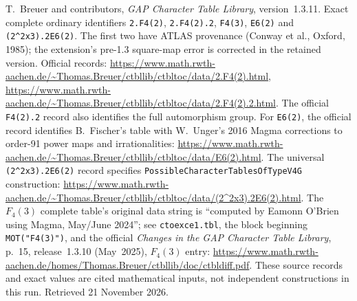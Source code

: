 T.~Breuer and contributors, \emph{GAP Character Table Library},
version~1.3.11. Exact complete ordinary identifiers
\texttt{2.F4(2)}, \texttt{2.F4(2).2}, \texttt{F4(3)},
\texttt{E6(2)} and \texttt{(2\^{}2x3).2E6(2)}.
The first two have ATLAS provenance (Conway et al., Oxford, 1985);
the extension's pre-1.3 square-map error is corrected in the retained
version. Official records:
\url{https://www.math.rwth-aachen.de/~Thomas.Breuer/ctbllib/ctbltoc/data/2.F4(2).html},
\url{https://www.math.rwth-aachen.de/~Thomas.Breuer/ctbllib/ctbltoc/data/2.F4(2).2.html}.
The official \texttt{F4(2).2} record also identifies the full automorphism group.
For \texttt{E6(2)}, the official record identifies B.~Fischer's table
with W.~Unger's 2016 Magma corrections to order-91 power maps and
irrationalities:
\url{https://www.math.rwth-aachen.de/~Thomas.Breuer/ctbllib/ctbltoc/data/E6(2).html}.
The universal \texttt{(2\^{}2x3).2E6(2)} record specifies
\texttt{PossibleCharacterTablesOfTypeV4G} construction:
\url{https://www.math.rwth-aachen.de/~Thomas.Breuer/ctbllib/ctbltoc/data/(2^2x3).2E6(2).html}.
The $F_4(3)$ complete table's original data string is
``computed by Eamonn O'Brien using Magma, May/June 2024'';
see \texttt{ctoexce1.tbl}, the block beginning \texttt{MOT("F4(3)")},
and the official \emph{Changes in the GAP Character Table Library},
p.~15, release~1.3.10 (May~2025), $F_4(3)$ entry:
\url{https://www.math.rwth-aachen.de/homes/Thomas.Breuer/ctbllib/doc/ctbldiff.pdf}.
These source records and exact values are cited mathematical inputs,
not independent constructions in this run. Retrieved 21 November 2026.
